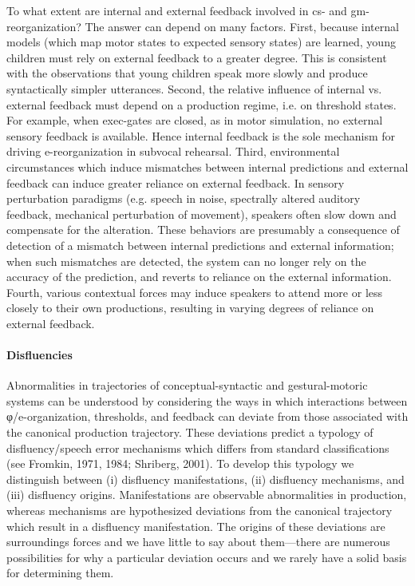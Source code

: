  To what extent are internal and external feedback involved in cs- and gm- reorganization? The answer can depend on many factors. First, because internal models (which map motor states to expected sensory states) are learned, young children must rely on external feedback to a greater degree. This is consistent with the observations that young children speak more slowly and produce syntactically simpler utterances. Second, the relative influence of internal vs. external feedback must depend on a production regime, i.e. on threshold states. For example, when exec-gates are closed, as in motor simulation, no external sensory feedback is available. Hence internal feedback is the sole mechanism for driving e-reorganization in subvocal rehearsal. Third, environmental circumstances which induce mismatches between internal predictions and external feedback can induce greater reliance on external feedback. In sensory perturbation paradigms (e.g. speech in noise, spectrally altered auditory feedback, mechanical perturbation of movement), speakers often slow down and compensate for the alteration. These behaviors are presumably a consequence of detection of a mismatch between internal predictions and external information; when such mismatches are detected, the system can no longer rely on the accuracy of the prediction, and reverts to reliance on the external information. Fourth, various contextual forces may induce speakers to attend more or less closely to their own productions, resulting in varying degrees of reliance on external feedback.

\paragraph{Disfluencies}

Abnormalities in trajectories of conceptual-syntactic and gestural-motoric systems can be understood by considering the ways in which interactions between φ/e-organization, thresholds, and feedback can deviate from those associated with the canonical production trajectory. These deviations predict a typology of disfluency/speech error mechanisms which differs from standard classifications (see Fromkin, 1971, 1984; Shriberg, 2001). To develop this typology we distinguish between (i) disfluency manifestations, (ii) disfluency mechanisms, and (iii) disfluency origins. Manifestations are observable abnormalities in production, whereas mechanisms are hypothesized deviations from the canonical trajectory which result in a disfluency manifestation. The origins of these deviations are surroundings forces and we have little to say about them—there are numerous possibilities for why a particular deviation occurs and we rarely have a solid basis for determining them. 

